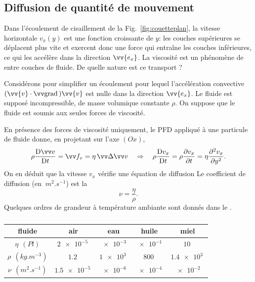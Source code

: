\documentclass[12pt,fancy]{cours}
\begin{document}
\subsection{Diffusion de quantité de mouvement}
\label{subsec:diffusion_viscosité}

Dans l'écoulement de cisaillement de la Fig.~\ref{fig:couetteplan}, la vitesse horizontale $v_{x}(y)$ est une fonction croissante de $y$: les couches supérieures se déplacent plus vite et exercent donc une force qui entraîne les couches inférieures, ce qui les  accélère dans la direction $\vv{e_x}$. La viscosité est un phénomène de  entre couches de fluide. De quelle nature est ce transport ?

Considérons pour simplifier un écoulement pour lequel l'accélération convective $(\vv{v}\cdot\grad)\vv{v}$ est nulle dans la direction $\vv{e_x}$. Le fluide est supposé incompressible, de masse volumique constante $\rho$. On suppose que le fluide est soumis aux seules forces de viscosité.

En présence des
forces de viscosité uniquement, le PFD appliqué à une particule de fluide donne, en projetant sur l'axe $(Ox)$,
\begin{equation}\label{eq:diffu_p}
	\rho \Dt{\Vec{v}} = \Vec{f_v} = \eta \, \Deltav{v} \Rar 
\rho \Dt{v_x} =\rho \frac{\partial v_x}{\partial t} = \eta \frac{\partial^2 v_x}{\partial y^2}. 
 \end{equation}
  On en déduit que la vitesse $v_x$ vérifie une équation de diffusion 
Le coefficient de diffusion (en $\SI{}{m^2.s^{-1}}$) est la 
\begin{equation}
\nu = \frac{\eta}{\rho}.
\end{equation}
Quelques ordres de grandeur à température ambiante sont donnés dans le . 
\begin{table}[h!]
	\centering
	\begin{tabular}{|c||c|c|c|c|}
		\hline
		fluide & air & eau & huile & miel \\
		\hline
		$\eta~\SI{}{(Pl)}$ &  $\SI{2e-5}{}$ &
$\SI{e-3}{}$ & $\SI{e-1}{}$  & $\SI{10}{}$ \\ 
\hline
$\rho~\SI{}{(kg.m^{-3})}$ &  $\SI{1.2}{}$ & 
$\SI{1e3}{}$ & $\SI{800}{}$  & $\SI{1.4e3}{}$ \\
\hline
		$\nu~\SI{}{(m^2.s^{-1})}$ &  $\SI{1.5e-5}{}$ &
		$\SI{e-6}{}$ & $\SI{e-4}{}$  & $\SI{e-2}{}$ \\
		\hline
		\end{tabular}
	\caption{}
	\label{tab:nu}
\end{table}
\end{document}
